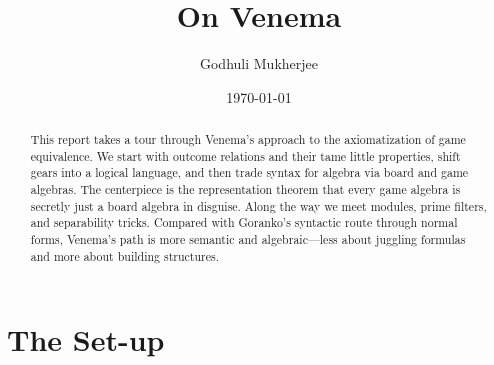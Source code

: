 \documentclass[12pt]{article}
\title{On Venema}
\author{Godhuli Mukherjee}
\date{\today}
\begin{document}
\maketitle
\begin{abstract}
This report takes a tour through Venema’s approach to the axiomatization of game equivalence. We start with outcome relations and their tame little properties, shift gears into a logical language, and then trade syntax for algebra via board and game algebras. The centerpiece is the representation theorem that every game algebra is secretly just a board algebra in disguise. Along the way we meet modules, prime filters, and separability tricks. Compared with Goranko’s syntactic route through normal forms, Venema’s path is more semantic and algebraic—less about juggling formulas and more about building structures.

\end{abstract}
\tableofcontents

\section{The Set-up}
\end{document}
